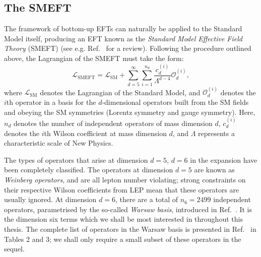 \documentclass[withindex,glossary]{cam-thesis}
\begin{document}
\subsection{The SMEFT}
\label{subsec:the_smeft}
The framework of bottom-up EFTs can naturally be applied to the Standard Model itself, producing an EFT known as the \textit{Standard Model Effective Field Theory} (SMEFT) (see e.g. Ref.~\cite{Brivio:2017vri} for a review). 
Following the procedure outlined above, the Lagrangian of the SMEFT must take the form:
\begin{equation}
\mathcal{L}_{\text{SMEFT}} = \mathcal{L}_{\text{SM}} + \sum_{d=5}^{\infty} \sum_{i=1}^{n_d} \frac{c_d^{(i)}}{\Lambda^{d-4}} \mathcal{O}_{d}^{(i)},
\end{equation}
where $\mathcal{L}_{\text{SM}}$ denotes the Lagrangian of the Standard Model, and $\mathcal{O}_{d}^{(i)}$ denotes the $i$th operator in a basis for the $d$-dimensional operators built from the SM fields and obeying the SM symmetries (Lorentz symmetry and gauge symmetry). Here, $n_d$ denotes the number of independent operators of mass dimension $d$, $c_d^{(i)}$ denotes the $i$th Wilson coefficient at mass dimension $d$, and $\Lambda$ represents a characteristic scale of New Physics.

The types of operators that arise at dimension $d=5$, $d=6$ in the expansion have been completely classified. The operators at dimension $d=5$ are known as \textit{Weinberg operators}, and are all lepton number violating; strong constraints on their respective Wilson coefficients from LEP mean that these operators are usually ignored. At dimension $d=6$, there are a total of $n_6 = 2499$ independent operators, parametrised by the so-called \textit{Warsaw basis}, introduced in Ref.~\cite{Grzadkowski:2010es}. It is the dimension six terms which we shall be most interested in throughout this thesis. The complete list of operators in the Warsaw basis is presented in Ref.~\cite{Grzadkowski:2010es} in Tables 2 and 3; we shall only require a small subset of these operators in the sequel.
 
\end{document}

